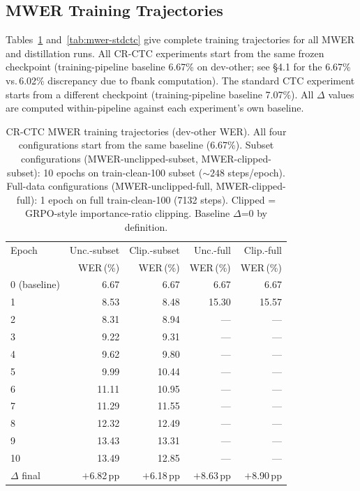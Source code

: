 \subsection{MWER Training Trajectories}

Tables~\ref{tab:mwer-crctc} and~\ref{tab:mwer-stdctc} give complete training trajectories for
all MWER and distillation runs. All CR-CTC experiments start from the same frozen checkpoint
(training-pipeline baseline 6.67\% on dev-other; see §4.1 for the 6.67\%\,vs.\,6.02\%
discrepancy due to fbank computation). The standard CTC experiment starts from a different
checkpoint (training-pipeline baseline 7.07\%). All $\Delta$ values are computed within-pipeline
against each experiment's own baseline.

\begin{table}[t]
\centering
\small
\caption{CR-CTC MWER training trajectories (dev-other WER). All four configurations start from
the same baseline (6.67\%). Subset configurations (MWER-unclipped-subset, MWER-clipped-subset): 10 epochs on train-clean-100 subset (${\sim}248$ steps/epoch). Full-data configurations (MWER-unclipped-full, MWER-clipped-full): 1 epoch on full train-clean-100 (7132 steps). Clipped = GRPO-style importance-ratio clipping. Baseline $\Delta$=0 by definition.}
\label{tab:mwer-crctc}
\begin{tabular}{lrrrr}
\hline
Epoch & Unc.-subset & Clip.-subset & Unc.-full & Clip.-full \\
 & WER\,(\%) & WER\,(\%) & WER\,(\%) & WER\,(\%) \\
\hline
0 (baseline) & 6.67 & 6.67 & 6.67 & 6.67 \\
1            & 8.53 & 8.48 & 15.30 & 15.57 \\
2            & 8.31 & 8.94 & ---   & ---   \\
3            & 9.22 & 9.31 & ---   & ---   \\
4            & 9.62 & 9.80 & ---   & ---   \\
5            & 9.99 & 10.44 & ---   & ---   \\
6            & 11.11 & 10.95 & ---   & ---   \\
7            & 11.29 & 11.55 & ---   & ---   \\
8            & 12.32 & 12.49 & ---   & ---   \\
9            & 13.43 & 13.31 & ---   & ---   \\
10           & 13.49 & 12.85 & ---   & ---   \\
\hline
$\Delta$ final & $+$6.82\,pp & $+$6.18\,pp & $+$8.63\,pp & $+$8.90\,pp \\
\hline
\end{tabular}
\end{table}

